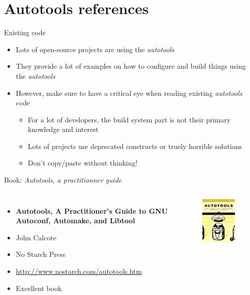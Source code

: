 \section{Autotools references}

\begin{frame}{Existing code}
  \begin{itemize}
  \item Lots of open-source projects are using the {\em autotools}
  \item They provide a lot of examples on how to configure and build
    things using the {\em autotools}
  \item However, make sure to have a critical eye when reading
    existing {\em autotools} code
    \begin{itemize}
    \item For a lot of developers, the build system part is not their
      primary knowledge and interest
    \item Lots of projects use deprecated constructs or truely
      horrible solutions
    \item Don't copy/paste without thinking!
    \end{itemize}
  \end{itemize}
\end{frame}

\begin{frame}{Book: {\em Autotools, a practitionner guide}}
  \begin{columns}
    \begin{itemize}
    \item {\bf Autotools, A Practitioner's Guide to GNU Autoconf, Automake, and Libtool}
    \item John Calcote
    \item No Starch Press
    \item \url{http://www.nostarch.com/autotools.htm}
    \item Excellent book.
    \end{itemize}
    \includegraphics[width=0.6\textwidth]{slides/autotools-references/autotools-book.png}
  \end{columns}
\end{frame}

